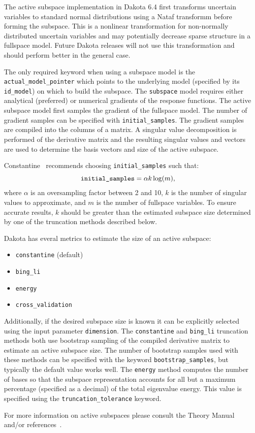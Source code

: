 The active subspace implementation in Dakota 6.4 first transforms
uncertain variables to standard normal distributions using a Nataf
transformm before forming the subspace.  This is a nonlinear
transformation for non-normally distributed uncertain variables and
may potentially decrease sparse structure in a fullspace model. Future
Dakota releases will not use this transformation and should perform
better in the general case.

The only required keyword when using a subspace model is the
\texttt{actual\_model\_pointer} which points to the underlying model
(specified by its \texttt{id\_model}) on which to build the
subspace. The \texttt{subspace} model requires either analytical
(preferred) or numerical gradients of the response functions. The
active subspace model first samples the gradient of the fullspace
model. The number of gradient samples can be specified with
\texttt{initial\_samples}. The gradient samples are compiled into the
columns of a matrix. A singular value decomposition is performed of
the derivative matrix and the resulting singular values and vectors
are used to determine the basis vectors and size of the active
subspace.

Constantine~\cite{constantine2015active} recommends choosing \texttt{initial\_samples}
such that:
$$\text{\texttt{initial\_samples}} = \alpha k \log(m),$$
where $\alpha$ is an oversampling factor between 2 and 10, $k$ is the
number of singular values to approximate, and $m$ is the number of
fullspace variables. To ensure accurate results, $k$ should be greater
than the estimated subspace size determined by one of the truncation
methods described below.

Dakota has everal metrics to estimate the size of an active subspace:
\begin{itemize}
\item \texttt{constantine} (default)
\item \texttt{bing\_li}
\item \texttt{energy}
\item \texttt{cross\_validation}
\end{itemize}
Additionally, if the desired subspace size is known it can be
explicitly selected using the input parameter \texttt{dimension}. The
\texttt{constantine} and \texttt{bing\_li} truncation methods both use
bootstrap sampling of the compiled derivative matrix to estimate an
active subspace size. The number of bootstrap samples used with these
methods can be specified with the keyword \texttt{bootstrap\_samples},
but typically the default value works well. The \texttt{energy} method
computes the number of bases so that the subspace representation
accounts for all but a maximum percentage (specified as a decimal) of
the total eigenvalue energy. This value is specified using the
\texttt{truncation\_tolerance} keyword.

For more information on active subspaces please consult the Theory
Manual~\cite{TheoMan} and/or
references~\cite{Constantine-preprint-active,constantine2014active,constantine2015active}.




